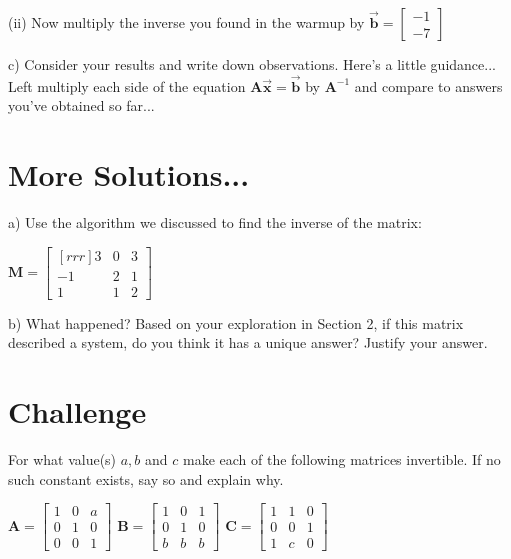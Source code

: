 \documentclass{article}
\begin{document}
\begin{flushleft}
(ii) Now multiply the inverse you found in the warmup by $\vec{\textbf{b}}=\begin{bmatrix} -1 \\ -7 \end{bmatrix}$ 

\vspace{1.5in}

c) Consider your results and write down observations. Here's a little guidance...
Left multiply each side of the equation $\textbf{A}\vec{\textbf{x}}=\vec{\textbf{b}}$ by $\textbf{A}^{-1}$ and compare to answers you've obtained so far...

\vspace{2in}

\newpage

\section{More Solutions...}

a) Use the algorithm we discussed to find the inverse of the matrix:

\begin{center}
$\textbf{M} = 
\begin{bmatrix}[rrr]
3 & 0 & 3\\
-1 & 2 & 1\\
1 & 1 & 2
\end{bmatrix}
$\\\end{center}

\vspace{3in}

b) What happened? Based on your exploration in Section 2, if this matrix described a system, do you think it has a unique answer? Justify your answer.


\pagebreak

\section{Challenge}

For what value(s) $a, b$ and $c$ make each of the following matrices invertible.  If no such constant exists, say so and explain why.

\begin{center}
$\textbf{A}= \begin{bmatrix}
1 & 0 & a\\
0 & 1 & 0\\
0 & 0 & 1
\end{bmatrix} $
\hspace{1in}
$\textbf{B}= \begin{bmatrix}
1 & 0 & 1\\
0 & 1 & 0\\
b & b & b
\end{bmatrix} $
\hspace{1in}
$\textbf{C}= \begin{bmatrix}
1 & 1 & 0\\
0 & 0 & 1\\
1 & c & 0
\end{bmatrix} $
\end{center}

\end{flushleft}
\end{document}
